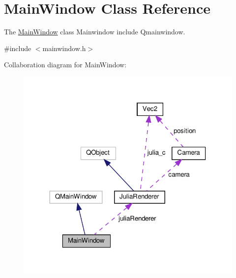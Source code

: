 \hypertarget{classMainWindow}{}\section{Main\+Window Class Reference}
\label{classMainWindow}


The \hyperlink{classMainWindow}{Main\+Window} class Mainwindow include Qmainwindow.  




{\ttfamily \#include $<$mainwindow.\+h$>$}



Collaboration diagram for Main\+Window\+:\nopagebreak
\begin{figure}[H]
\begin{center}
\leavevmode
\includegraphics[width=318pt]{classMainWindow__coll__graph}
\end{center}
\end{figure}

